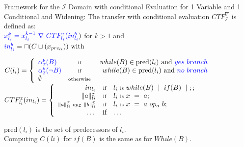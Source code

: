 \begin{frame}{Framework for the $\mathcal{I}$ Domain with conditional Evaluation for 1 Variable and 1 Conditional and Widening:}
\scriptsize The transfer with conditional evaluation $CTF_\mathcal{I}^\nabla$ is defined as:\\ ${\color{blue} x_{l_i}^k=  x_{l_i}^{k-1}~\nabla~ CTF^{\scriptscriptstyle \mathcal{I}}_{l_i}(in_{l_i}^b})$ for $k > 1$ and \\ $ {\color{blue}in_{l_i}^b}= \sqcap (C \sqcup(x_{pre_{li}})) ~\text{with}$

\xxx
$C(l_i)= \left\{ 
\begin{array}{lcr} {\color{blue}\alpha_{\scriptscriptstyle \mathcal{I}}^{\scriptscriptstyle b} (B)} & \mbox{\scriptsize if}& \textstyle ~while(B) \in \mbox{pred}(l_i)~ \mbox{and}~{\color{blue} yes~ branch} \\
	
	{\color{blue}\alpha_{\scriptscriptstyle \mathcal{I}}^{\scriptscriptstyle b} (\neg B)} & \mbox{\scriptsize if}& \textstyle while(B) \in \mbox{pred}(l_i)~ \mbox{and}~{\color{blue} no~ branch} \\
	\emptyset  & \mbox{\scriptsize otherwise} &  
\end{array}\right.$ \\

\xxx
$  CTF^{\scriptscriptstyle \mathcal{I}}_{l_i}(in_{l_i}) =     \left\{ \begin{array}{rcl}
	\textstyle	in_{l_i} &  \mbox{\scriptsize if}& \textstyle l_i~\text{\scriptsize is}~while(B)~\mid~ if(B) ~\mid~;;   \\
	\textstyle	\|a\|_{li}^{\scriptscriptstyle \mathcal{I}}  & \mbox{\scriptsize if} & \textstyle l_i~\mbox{\scriptsize is}~x~=~a; \\
	\scriptstyle	\|a\|_{li}^{\scriptscriptstyle \mathcal{I}}~op_\mathcal{I}~ \|b\|_{li}^{\scriptscriptstyle \mathcal{I}}  & \mbox{\scriptsize if} &  \textstyle l_i~\mbox{\scriptsize is}~x~=~a~op_a~b; \\
	\dots & \mbox{if} & \dots
\end{array}\right.$
\newline

\xxx
pred$(l_i)$ is the set of predecessors of $l_i$.\\
Computing $C(li)$  for $if(B)$ is the same as for $While(B)$.

\end{frame}




